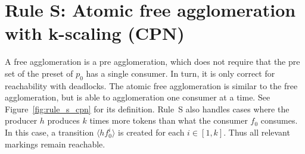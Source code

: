 \section*{Rule S: Atomic free agglomeration with k-scaling (CPN)}\label{sec:rule_s_cpn}
A free agglomeration is a pre agglomeration, which does not require that the pre set of the preset of $p_0$ has a single consumer.
In turn, it is only correct for reachability with deadlocks.
The atomic free agglomeration is similar to the free agglomeration, but is able to agglomeration one consumer at a time.
See Figure~\ref{fig:rule_s_cpn} for its definition.
Rule~S also handles cases where the producer $h$ produces $k$ times more tokens than what the consumer $f_0$ consumes.
In this case, a transition $\langle h f_0^i\rangle$ is created for each $i\in [1, k]$.
Thus all relevant markings remain reachable.

